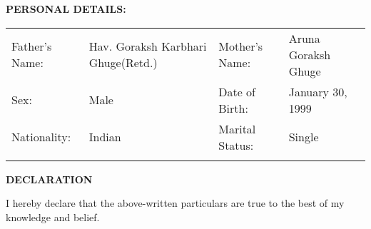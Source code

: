 \documentclass[a4paper, 10pt]{article}
\begin{document}
{\textbf{\Large{PERSONAL DETAILS:}}}\\

\begin{tabular}{ p{3cm} p{6cm} p{3cm} p{6cm} }
Father's Name: & Hav$.$ Goraksh Karbhari Ghuge(Retd.) & Mother's Name: & Aruna Goraksh Ghuge \\ 
Sex: & Male & Date of Birth: & January 30, 1999\\     
Nationality: & Indian &Marital Status: & Single \\ 
\\
\end{tabular}


{\textbf{\Large{DECLARATION}}}\\

\centerline{I hereby declare that the above-written particulars are true to the best of my knowledge and belief.}

\end{document}
